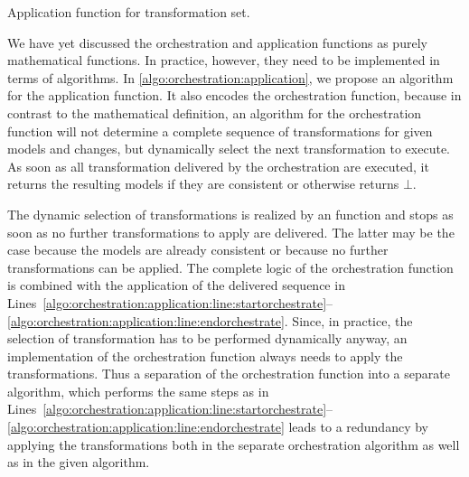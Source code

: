 \begin{algorithm}
\begin{algorithmic}[1]
            \State {} \label{algo:orchestration:application:line:returnresult}
        \EndProcedure
    \end{algorithmic}
    \caption[Application function for transformations]{Application function for transformation set.}
    \label{algo:orchestration:application}
\end{algorithm}

We have yet discussed the orchestration and application functions as purely mathematical functions.
In practice, however, they need to be implemented in terms of algorithms.
In \autoref{algo:orchestration:application}, we propose an algorithm for the application function.
It also encodes the orchestration function, because in contrast to the mathematical definition, an algorithm for the orchestration function will not determine a complete sequence of transformations for given models and changes, but dynamically select the next transformation to execute.
As soon as all transformation delivered by the orchestration are executed, it returns the resulting models if they are consistent or otherwise returns $\bot$.

The dynamic selection of transformations is realized by an  function and stops as soon as no further transformations to apply are delivered.
The latter may be the case because the models are already consistent or because no further transformations can be applied.
The complete logic of the orchestration function is combined with the application of the delivered sequence in Lines~\ref{algo:orchestration:application:line:startorchestrate}--\ref{algo:orchestration:application:line:endorchestrate}.
Since, in practice, the selection of transformation has to be performed dynamically anyway, an implementation of the orchestration function always needs to apply the transformations.
Thus a separation of the orchestration function into a separate algorithm, which performs the same steps as in Lines~\ref{algo:orchestration:application:line:startorchestrate}--\ref{algo:orchestration:application:line:endorchestrate} leads to a redundancy by applying the transformations both in the separate orchestration algorithm as well as in the given algorithm.

